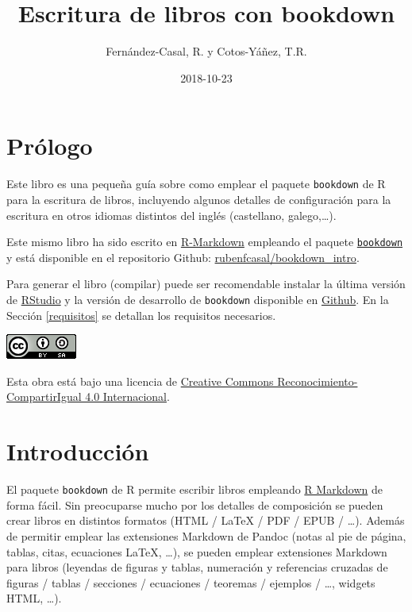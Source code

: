 \documentclass[]{book}
\title{Escritura de libros con bookdown}
\author{Fernández-Casal, R. y Cotos-Yáñez, T.R.}
\date{2018-10-23}
\theoremstyle{definition}
\theoremstyle{definition}
\theoremstyle{definition}
\theoremstyle{remark}
\begin{document}
\maketitle

{
\setcounter{tocdepth}{1}
\tableofcontents
}
\chapter*{Prólogo}\label{prologo}

Este libro es una pequeña guía sobre como emplear el paquete
\texttt{bookdown} de R para la escritura de libros, incluyendo algunos
detalles de configuración para la escritura en otros idiomas distintos
del inglés (castellano, galego,\ldots{}).

Este mismo libro ha sido escrito en
\href{http://rmarkdown.rstudio.com}{R-Markdown} empleando el paquete
\href{https://bookdown.org/yihui/bookdown/}{\texttt{bookdown}} y está
disponible en el repositorio Github:
\href{https://github.com/rubenfcasal/bookdown_intro}{rubenfcasal/bookdown\_intro}.

Para generar el libro (compilar) puede ser recomendable instalar la
última versión de
\href{(https://www.rstudio.com/products/rstudio/download/)}{RStudio} y
la versión de desarrollo de \texttt{bookdown} disponible en
\href{https://github.com/rstudio/bookdown}{Github}. En la Sección
\ref{requisitos} se detallan los requisitos necesarios.

\begin{flushleft}\includegraphics{images/by-sa-88x31} \end{flushleft}

Esta obra está bajo una licencia de
\href{https://creativecommons.org/licenses/by-sa/4.0/deed.es}{Creative
Commons Reconocimiento-CompartirIgual 4.0 Internacional}.

\chapter{Introducción}\label{intro}

El paquete \texttt{bookdown} \citep{R-bookdown} de R \citep{R-base}
permite escribir libros empleando \href{http://rmarkdown.rstudio.com}{R
Markdown} de forma fácil. Sin preocuparse mucho por los detalles de
composición se pueden crear libros en distintos formatos (HTML / LaTeX /
PDF / EPUB / \ldots{}). Además de permitir emplear las extensiones
Markdown de Pandoc (notas al pie de página, tablas, citas, ecuaciones
LaTeX, \ldots{}), se pueden emplear extensiones Markdown para libros
(leyendas de figuras y tablas, numeración y referencias cruzadas de
figuras / tablas / secciones / ecuaciones / teoremas / ejemplos /
\ldots{}, widgets HTML, \ldots{}).
\end{document}
